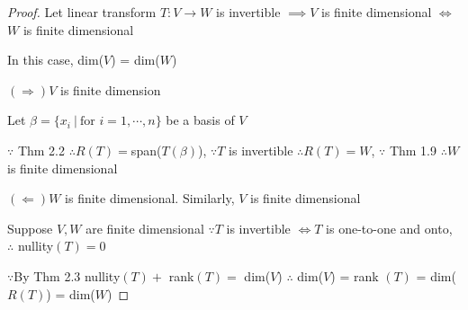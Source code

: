 \begin{proof}
	Let linear transform $T:V\rightarrow W$ is invertible $\implies V$ is finite dimensional $\Leftrightarrow$ $W$ is finite dimensional
	
	In this case, dim($V$) = dim($W$) 
	
	$(\Rightarrow) V$ is finite dimension
	
	Let $\beta = \{ x_i ~|~ \text{for } i = 1,\cdots , n\}$ be a basis of $V$
	
	$\because$ Thm 2.2 $\therefore R(T) = $span($T(\beta)$), $\because T$ is invertible $\therefore R(T) = W$, $\because $ Thm 1.9 $\therefore W$ is finite dimensional
	
	$(\Leftarrow) W$ is finite dimensional. Similarly, $V$ is finite dimensional 
	
	Suppose $V,W$ are finite dimensional $\because T$ is invertible $\Leftrightarrow T$ is one-to-one and onto,~$\therefore $ nullity$(T) = 0 $
	
	$\because $By Thm 2.3 nullity$(T) + $ rank$(T) =$ dim($V$) $\therefore$ dim($V$) = rank $(T)$ = dim($R(T)$) = dim($W$)
\end{proof}
